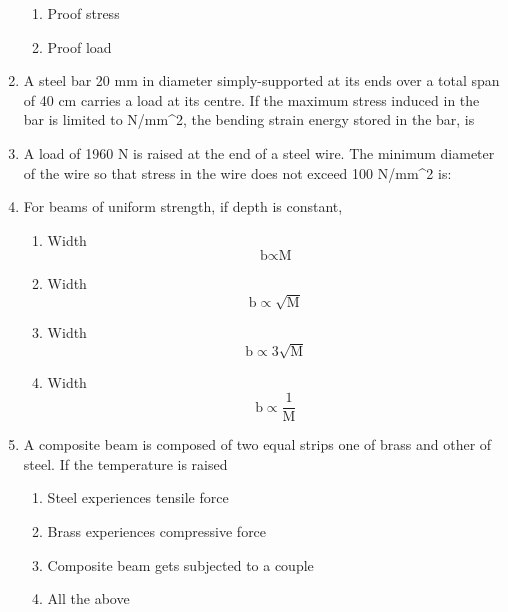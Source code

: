 \documentclass[11pt,a4paper]{article}
\begin{document}
\begin{enumerate}
\begin{enumerate}[label=\Alph*.]
\item{Proof stress}
\item{Proof load}
\end{enumerate}
\item{A steel bar 20 mm in diameter simply-supported at its ends over a total span of 40 cm carries a load at its centre. If the maximum stress induced in the bar is limited to N/mm\^{}2, the bending strain energy stored in the bar, is
}
\\
\item{A load of 1960 N is raised at the end of a steel wire. The minimum diameter of the wire so that stress in the wire does not exceed 100 N/mm\^{}2 is:
}
\\\begin{enumerate*}[itemjoin=\qquad, label=\Alph*.]
\item{4.0 mm}
\item{4.5 mm}
\item{5.0 mm}
\item{5.5 mm}
\end{enumerate*}
\item{For beams of uniform strength, if depth is constant,}
\begin{enumerate}[label=\Alph*.]
\item{Width $${\text{b}} \propto {\text{M}}$$}
\item{Width $${\text{b}} \propto \sqrt {\text{M}} $$}
\item{Width $${\text{b}} \propto 3\sqrt {\text{M}} $$}
\item{Width $${\text{b}} \propto \frac{1}{{\text{M}}}$$}
\end{enumerate}
\item{A composite beam is composed of two equal strips one of brass and other of steel. If the temperature is raised}
\begin{enumerate}[label=\Alph*.]
\item{Steel experiences tensile force}
\item{Brass experiences compressive force}
\item{Composite beam gets subjected to a couple}
\item{All the above}

\end{enumerate}
\end{enumerate}
\end{document}
